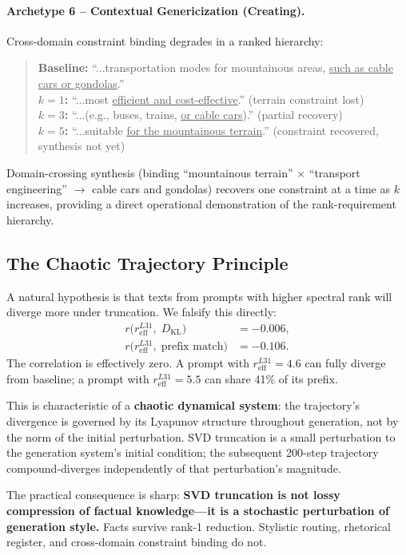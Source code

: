\documentclass{article}
\begin{document}
\paragraph{Archetype 6 -- Contextual Genericization (Creating).}
Cross-domain constraint binding degrades in a ranked hierarchy:
\begin{quote}
\small
\textbf{Baseline:} ``...transportation modes for mountainous areas, \underline{such as cable cars or gondolas}.''\\
\textbf{$k\!=\!1$:} ``...most \underline{efficient and cost-effective}.'' (terrain constraint lost)\\
\textbf{$k\!=\!3$:} ``...(e.g., buses, trains, \underline{or cable cars}).'' (partial recovery)\\
\textbf{$k\!=\!5$:} ``...suitable \underline{for the mountainous terrain}.'' (constraint recovered, synthesis not yet)
\end{quote}
Domain-crossing synthesis (binding ``mountainous terrain'' $\times$ ``transport engineering''
$\to$ cable cars and gondolas) recovers one constraint at a time as $k$ increases,
providing a direct operational demonstration of the rank-requirement hierarchy.

\subsection{The Chaotic Trajectory Principle}
A natural hypothesis is that texts from prompts with higher spectral rank will
diverge more under truncation.  We falsify this directly:
\begin{align}
  r\bigl(r_\text{eff}^{L31},\; D_\text{KL}\bigr) &= -0.006, \\
  r\bigl(r_\text{eff}^{L31},\; \text{prefix match}\bigr) &= -0.106.
\end{align}
The correlation is effectively zero.  A prompt with $r_\text{eff}^{L31}\!=\!4.6$
can fully diverge from baseline; a prompt with $r_\text{eff}^{L31}\!=\!5.5$ can
share 41\% of its prefix.

This is characteristic of a \textbf{chaotic dynamical system}: the trajectory's
divergence is governed by its Lyapunov structure throughout generation, not by the
norm of the initial perturbation.  SVD truncation is a small perturbation to the
generation system's initial condition; the subsequent 200-step trajectory
compound-diverges independently of that perturbation's magnitude.

The practical consequence is sharp: \textbf{SVD truncation is not lossy compression
of factual knowledge---it is a stochastic perturbation of generation style.}
Facts survive rank-1 reduction.  Stylistic routing, rhetorical register, and
cross-domain constraint binding do not.
\end{document}
